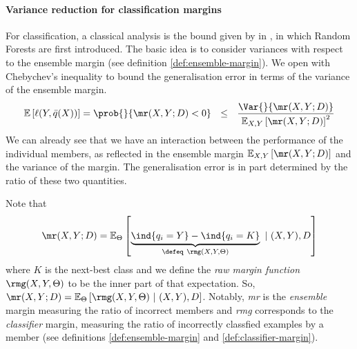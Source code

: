 \documentclass[
    a4paper, %
	fontsize=10pt, %
	twoside=false, %
]{kaobook}
\begin{document}
\paragraph{Variance reduction for classification margins} For classification, a classical analysis is the bound given by \citeauthor{breiman_RandomForests_2001} in \cite{breiman_RandomForests_2001}, in which Random Forests are first introduced. The basic idea is to consider variances with respect to the ensemble margin (see definition \ref{def:ensemble-margin}).
We open with Chebychev's inequality to bound the generalisation error in terms of the variance of the ensemble margin.
$$
\mathbb{E}\left[ \ell(Y, \bar{q}(X)) \right]  = \prob{}{\mr(X, Y; D) < 0 }  ~ ~ \leq ~ ~ \frac{\Var{}{\mr(X, Y; D)  }}{\mathbb{E}_{X,Y}\left[ \mr(X, Y; D)  \right]^2}
$$
We can already see that we have an interaction between the performance of the individual members, as reflected in the ensemble margin $\mathbb{E}_{X,Y}\left[ \mr(X, Y; D)  \right]$ and the variance of the margin.
The generalisation error is in part determined by the ratio of these two quantities.


Note that
$$
\mr(X, Y;D) = \mathbb{E}_{\Theta}\left[ 
\underbrace{
\ind{q_{i}=Y} - \ind{q_{i}=K} 
}_{
\defeq ~\rmg(X, Y, \Theta) 
}
~|~(X,Y), D \right] 
$$
where $K$ is the next-best class and we define the \textit{raw margin function} $\rmg(X, Y, \Theta)$ to be the inner part of that expectation. So, 
$\mr(X, Y;D) = \mathbb{E}_{\Theta}\left[ 
\rmg(X, Y, \Theta) 
~|~(X,Y), D \right]$. Notably, \textit{mr} is the \textit{ensemble} margin measuring the ratio of incorrect members and \textit{rmg} corresponds to the \textit{classifier} margin, measuring the ratio of incorrectly classfied examples by a member (see definitions \ref{def:ensemble-margin} and \ref{def:classifier-margin}).
\end{document}
